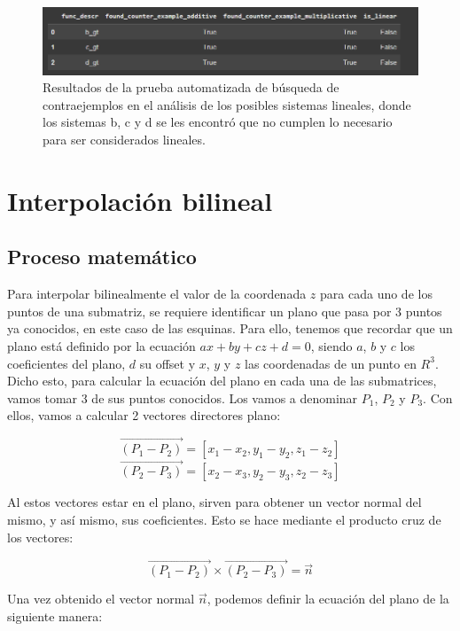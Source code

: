 \documentclass[12pt,a4paper]{article}
\begin{document}
\begin{figure}[h!]
    \centering
    \includegraphics[width=\textwidth]{../img/counterexamples.PNG}
    \caption{Resultados de la prueba automatizada de búsqueda de contraejemplos en el análisis de los posibles sistemas lineales, donde los sistemas b, c y d se les encontró que no cumplen lo necesario para ser considerados lineales.}
    \label{fig:counterexamples}
\end{figure}

\section{Interpolación bilineal}

\subsection{Proceso matemático}

Para interpolar bilinealmente el valor de la coordenada $z$ para cada uno de los puntos de una submatriz, se requiere identificar un plano que pasa por 3 puntos ya conocidos, en este caso de las esquinas. Para ello, tenemos que recordar que un plano está definido por la ecuación $ax + by + cz + d = 0$, siendo $a$, $b$ y $c$ los coeficientes del plano, $d$ su offset y $x$, $y$ y $z$ las coordenadas de un punto en $R^3$. \\

Dicho esto, para calcular la ecuación del plano en cada una de las submatrices, vamos tomar 3 de sus puntos conocidos. Los vamos a denominar $P_1$, $P_2$ y $P_3$. Con ellos, vamos a calcular 2 vectores directores plano:

\[
\vec{(P_1 - P_2)} = [x_1 - x_2, y_1 - y_2, z_1 - z_2]
\]
\[
\vec{(P_2 - P_3)} = [x_2 - x_3, y_2 - y_3, z_2 - z_3]
\]

Al estos vectores estar en el plano, sirven para obtener un vector normal del mismo, y así mismo, sus coeficientes. Esto se hace mediante el producto cruz de los vectores:

\[
\vec{(P_1 - P_2)} \times \vec{(P_2 - P_3)} = \vec{n}
\]

Una vez obtenido el vector normal $\vec{n}$, podemos definir la ecuación del plano de la siguiente manera:
\end{document}

